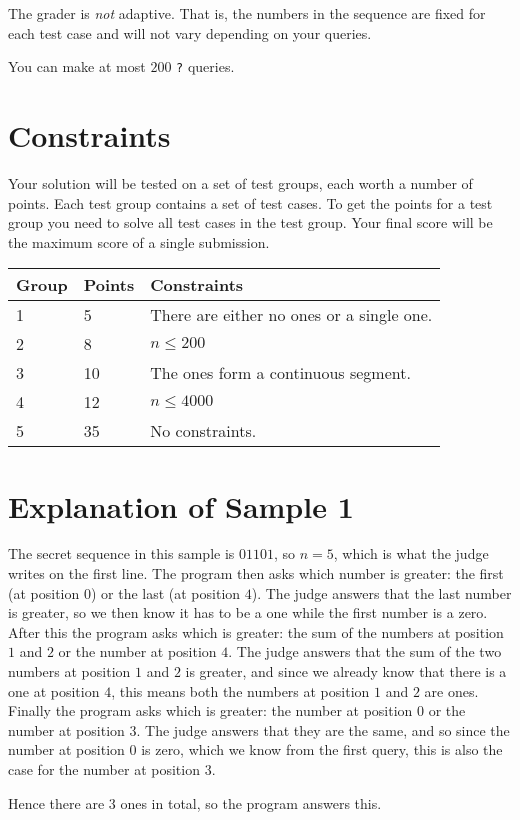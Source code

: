 The grader is \emph{not} adaptive.
That is, the numbers in the sequence are fixed for each test case and will not vary depending on your queries.

You can make at most $200$ \texttt{?} queries.

\section*{Constraints}
Your solution will be tested on a set of test groups, each worth a number of points.
Each test group contains a set of test cases.
To get the points for a test group you need to solve all test cases in the test group.
Your final score will be the maximum score of a single submission.

\noindent
\begin{tabular}{| l | l | l |}
\hline
Group & Points & Constraints \\ \hline
1     & 5     & There are either no ones or a single one. \\ \hline
2     & 8    & $n \leq 200$ \\ \hline
3     & 10    & The ones form a continuous segment. \\ \hline
4     & 12    & $n \leq 4000$ \\ \hline
5     & 35    & No constraints. \\ \hline
\end{tabular}

\section*{Explanation of Sample 1}
The secret sequence in this sample is $01101$, so $n = 5$, which is what the judge writes on the first line.
The program then asks which number is greater: the first (at position $0$) or the last (at position $4$).
The judge answers that the last number is greater, so we then know it has to be a one while the first number is a zero.
After this the program asks which is greater: the sum of the numbers at position $1$ and $2$ or the number at position $4$.
The judge answers that the sum of the two numbers at position $1$ and $2$ is greater, and since we already
know that there is a one at position $4$, this means both the numbers at position $1$ and $2$ are ones.
Finally the program asks which is greater: the number at position $0$ or the number at position $3$.
The judge answers that they are the same, and so since the number at position $0$ is zero, which we know
from the first query, this is also the case for the number at position $3$.

Hence there are $3$ ones in total, so the program answers this.
